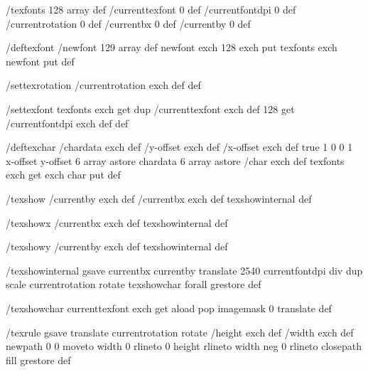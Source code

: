 
/texfonts 128 array def
/currenttexfont 0 def
/currentfontdpi 0 def
/currentrotation 0 def
/currentbx 0 def
/currentby 0 def

/deftexfont
 { /newfont 129 array def
   newfont exch 128 exch put
   texfonts exch newfont put } def

/settexrotation
 { /currentrotation exch def } def

/settexfont
 { texfonts exch get dup /currenttexfont exch def
   128 get /currentfontdpi exch def } def

/deftexchar
 { /chardata exch def
   /y-offset exch def
   /x-offset exch def
   true
   1 0 0 1 x-offset y-offset 6 array astore
   chardata
   6 array astore /char exch def
   texfonts exch get exch char put } def

/texshow
 { /currentby exch def
   /currentbx exch def
   texshowinternal } def

/texshowx
 { /currentbx exch def
   texshowinternal } def

/texshowy
 { /currentby exch def
   texshowinternal } def

/texshowinternal
 { gsave
   currentbx currentby translate
   2540 currentfontdpi div dup scale
   currentrotation rotate
   {texshowchar} forall
   grestore } def

/texshowchar
   { currenttexfont exch get aload pop imagemask 0 translate } def

/texrule
 { gsave
   translate
   currentrotation rotate
   /height exch def
   /width exch def
   newpath
    0 0 moveto
    width 0 rlineto
    0 height rlineto
    width neg 0 rlineto
    closepath
    fill
   grestore } def

